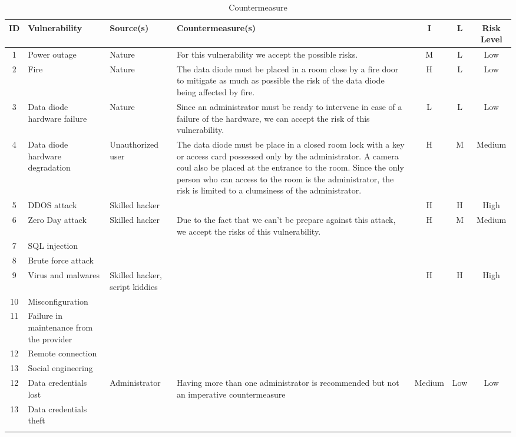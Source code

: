 \documentclass[a4paper,10pt]{article}
\begin{document}
\begin{longtable}{|c|p{}|p{2.5cm}|p{6.5cm}|c|c|c|}
\hline
\textbf{ID}& \textbf{Vulnerability} & \textbf{Source(s)} & \textbf{Countermeasure(s)} & \textbf{I} & \textbf{L} & \textbf{Risk Level}          \\
\hline
1 & Power outage  & Nature & For this vulnerability we accept the possible risks. & M & L & Low \\
\hline
2 & Fire & Nature & The data diode must be placed in a room close by a fire door to mitigate as much as possible the risk of the data diode being affected by fire. & H & L & Low \\
\hline
3 & Data diode hardware failure & Nature & Since an administrator must be ready to intervene in case of a failure of the hardware, we can accept the risk of this vulnerability. & L & L & Low \\
\hline
4 & Data diode hardware degradation & Unauthorized user & The data diode must be place in a closed room lock with a key or access card possessed only by the administrator. A camera coul also be placed at the entrance to the room. Since the only person who can access to the room is the administrator, the risk is limited to a clumsiness of the administrator. & H & M & Medium  \\
\hline
5 & DDOS attack & Skilled hacker & & H & H & High \\
\hline
6 & Zero Day attack & Skilled hacker & Due to the fact that we can't be prepare against this attack, we accept the risks of this vulnerability. & H & M & Medium \\
\hline
7 &  SQL injection & & & & & \\
\hline
8 & Brute force attack & & & & & \\
\hline
9 & Virus and malwares & Skilled hacker, script kiddies & & H & H & High \\
\hline
10 & Misconfiguration & & & & & \\
\hline
11 & Failure in maintenance from the provider& & & & & \\
\hline
12 & Remote connection & & & & & \\
\hline
13 & Social engineering & & & & & \\
\hline
12 & Data credentials lost & Administrator & Having more than one administrator is recommended but not an imperative countermeasure & Medium & Low & Low \\
\hline
13 &  Data credentials theft& & & & & \\
\hline
\caption{Countermeasure}
\label{tab:contermesure}
\end{longtable}
\end{document}
